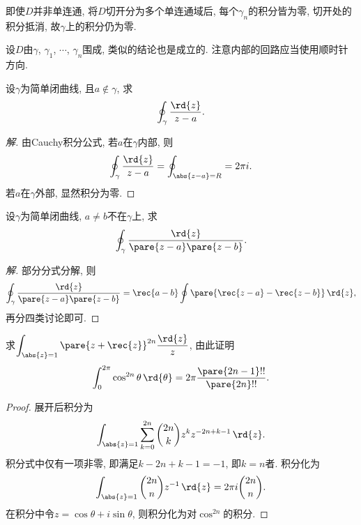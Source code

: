 \documentclass{ctexart}
\begin{document}
\begin{remark}
    即使$D$并非单连通, 将$D$切开分为多个单连通域后, 每个$\gamma_n$的积分皆为零, 切开处的积分抵消, 故$\gamma$上的积分仍为零.
\end{remark}
\begin{remark}
    设$D$由$\gamma$, $\gamma_1$, $\cdots$, $\gamma_n$围成, 类似的结论也是成立的. 注意内部的回路应当使用顺时针方向.
\end{remark}
\begin{sample}
    \begin{ex}
        设$\gamma$为简单闭曲线, 且$a\notin \gamma$, 求
        \[ \oint_\gamma \frac{\rd{z}}{z-a}. \]
    \end{ex}
    \begin{proof}[解]
        由Cauchy积分公式, 若$a$在$\gamma$内部, 则
        \[ \oint_\gamma \frac{\rd{z}}{z-a} = \oint_{\abs{z-a} = R} = 2\pi i. \]
        若$a$在$\gamma$外部, 显然积分为零.
    \end{proof}
\end{sample}
\begin{sample}
    \begin{ex}
        设$\gamma$为简单闭曲线, $a\neq b$不在$\gamma$上, 求
        \[ \oint_\gamma \frac{\rd{z}}{\pare{z-a}\pare{z-b}}. \]
    \end{ex}
    \begin{proof}[解]
        部分分式分解, 则
        \[ \oint_\gamma \frac{\rd{z}}{\pare{z-a}\pare{z-b}} = \rec{a-b}\oint\pare{\rec{z-a} - \rec{z-b}}\,\rd{z}, \]
        再分四类讨论即可.
    \end{proof}
\end{sample}
\begin{sample}
    \begin{ex}
        求$\displaystyle \int_{\abs{z}=1} \pare{z+\rec{z}}^{2n}\frac{\rd{z}}{z}$, 由此证明
        \[ \int_0^{2\pi} \cos^{2n} \theta\,\rd{\theta} = 2\pi \frac{\pare{2n-1}!!}{\pare{2n}!!}. \]
    \end{ex}
    \begin{proof}
        展开后积分为
        \[ \int_{\abs{z}=1} \sum_{k=0}^{2n} \binom{2n}{k}z^k z^{-2n +k-1} \,\rd{z}. \]
        积分式中仅有一项非零, 即满足$k-2n+k-1=-1$, 即$k=n$者. 积分化为
        \[ \int_{\abs{z}=1}\binom{2n}{n}z^{-1}\,\rd{z} = 2\pi i \binom{2n}{n}. \]
        在积分中令$z=\cos\theta + i\sin\theta$, 则积分化为对$\cos^{2n}$的积分.
    \end{proof}
\end{sample}

\end{document}
